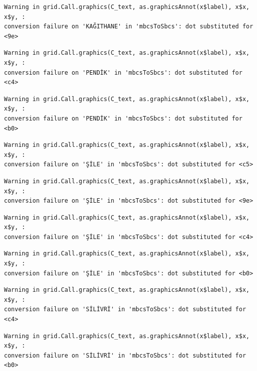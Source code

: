 \documentclass[
  11pt,
  a4paper,
  DIV=11,
  numbers=noendperiod]{scrartcl}
\begin{document}
\begin{verbatim}
Warning in grid.Call.graphics(C_text, as.graphicsAnnot(x$label), x$x, x$y, :
conversion failure on 'KAĞITHANE' in 'mbcsToSbcs': dot substituted for <9e>
\end{verbatim}

\begin{verbatim}
Warning in grid.Call.graphics(C_text, as.graphicsAnnot(x$label), x$x, x$y, :
conversion failure on 'PENDİK' in 'mbcsToSbcs': dot substituted for <c4>
\end{verbatim}

\begin{verbatim}
Warning in grid.Call.graphics(C_text, as.graphicsAnnot(x$label), x$x, x$y, :
conversion failure on 'PENDİK' in 'mbcsToSbcs': dot substituted for <b0>
\end{verbatim}

\begin{verbatim}
Warning in grid.Call.graphics(C_text, as.graphicsAnnot(x$label), x$x, x$y, :
conversion failure on 'ŞİLE' in 'mbcsToSbcs': dot substituted for <c5>
\end{verbatim}

\begin{verbatim}
Warning in grid.Call.graphics(C_text, as.graphicsAnnot(x$label), x$x, x$y, :
conversion failure on 'ŞİLE' in 'mbcsToSbcs': dot substituted for <9e>
\end{verbatim}

\begin{verbatim}
Warning in grid.Call.graphics(C_text, as.graphicsAnnot(x$label), x$x, x$y, :
conversion failure on 'ŞİLE' in 'mbcsToSbcs': dot substituted for <c4>
\end{verbatim}

\begin{verbatim}
Warning in grid.Call.graphics(C_text, as.graphicsAnnot(x$label), x$x, x$y, :
conversion failure on 'ŞİLE' in 'mbcsToSbcs': dot substituted for <b0>
\end{verbatim}

\begin{verbatim}
Warning in grid.Call.graphics(C_text, as.graphicsAnnot(x$label), x$x, x$y, :
conversion failure on 'SİLİVRİ' in 'mbcsToSbcs': dot substituted for <c4>
\end{verbatim}

\begin{verbatim}
Warning in grid.Call.graphics(C_text, as.graphicsAnnot(x$label), x$x, x$y, :
conversion failure on 'SİLİVRİ' in 'mbcsToSbcs': dot substituted for <b0>
\end{verbatim}
\end{document}
